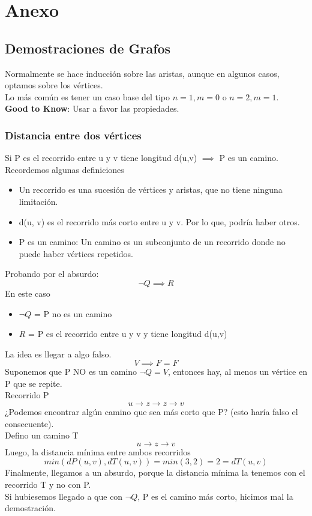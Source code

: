 \documentclass[10pt,a4paper]{article}
\begin{document}
\section*{Anexo}
\subsection*{Demostraciones de Grafos}
Normalmente se hace inducción sobre las aristas, aunque en algunos casos, optamos sobre los vértices. \\
Lo más común es tener un caso base del tipo $n=1, m=0$ o $n=2, m=1$. \\
\textbf{Good to Know}: Usar a favor las propiedades.
\subsubsection*{Distancia entre dos vértices}
\label{subsubsec:distancia_demostracion}
Si P es el recorrido entre u y v tiene longitud d(u,v) $\implies$ P es un camino. \\
Recordemos algunas definiciones
\begin{itemize}
    \item Un recorrido es una sucesión de vértices y aristas, que no tiene ninguna limitación.
    \item d(u, v) es el recorrido más corto entre u y v. Por lo que, podría haber otros. 
    \item P es un camino: Un camino es un subconjunto de un recorrido donde no puede haber vértices repetidos.
\end{itemize}
Probando por el absurdo: 
\[\neg Q \implies R\]
En este caso
\begin{itemize}
    \item $\neg Q$ = P no es un camino
    \item $R$ = P es el recorrido entre u y v y tiene longitud d(u,v)
\end{itemize}
La idea es llegar a algo falso.  
\[V \implies F = F\]
Suponemos que P NO es un camino $\neg Q = V$, entonces hay, al menos un vértice en P que se repite.  \\
Recorrido P \[u \rightarrow z \rightarrow z \rightarrow v\]
¿Podemos encontrar algún camino que sea más corto que P? (esto haría falso el consecuente). \\
Defino un camino T \[u \rightarrow z \rightarrow v\] 
Luego, la distancia mínima entre ambos recorridos
\[min(dP(u,v), dT(u,v)) = min(3, 2) = 2 = dT(u,v)\]
Finalmente, llegamos a un absurdo, porque la distancia mínima la tenemos con el recorrido T y no con P. \\
Si hubiesemos llegado a que con $\neg Q$, P es el camino más corto, hicimos mal la demostración.
\end{document}
